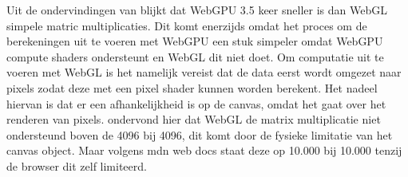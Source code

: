 Uit de ondervindingen van \textcite{Radin2021} blijkt dat WebGPU 3.5 keer sneller is dan WebGL simpele matric multiplicaties. Dit komt enerzijds omdat het proces om de berekeningen uit te voeren met WebGPU een stuk simpeler omdat WebGPU compute shaders ondersteunt en WebGL dit niet doet. Om computatie uit te voeren met WebGL is het namelijk vereist dat de data eerst wordt omgezet naar pixels zodat deze met een pixel shader kunnen worden berekent. Het nadeel hiervan is dat er een afhankelijkheid is op de canvas, omdat het gaat over het renderen van pixels. \textcite{Radin2021} ondervond hier dat WebGL de matrix multiplicatie niet ondersteund boven de 4096 bij 4096, dit komt door de fysieke limitatie van het canvas object. Maar volgens mdn web docs staat deze op 10.000 bij 10.000 tenzij de browser dit zelf limiteerd.
